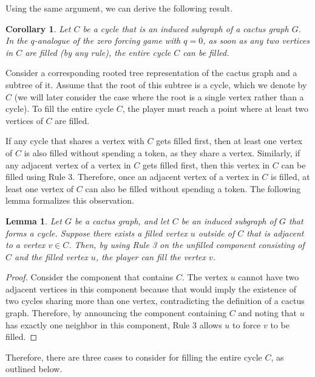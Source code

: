 \documentclass[11pt]{article}
\theoremstyle{plain}
\newtheorem{corollary}[theorem]{Corollary}
\newtheorem{lemma}[theorem]{Lemma}
\theoremstyle{definition}
\theoremstyle{remark}
\begin{document}
Using the same argument, we can derive the following result.

\begin{corollary}
   Let $C$ be a cycle that is an induced subgraph of a cactus graph $G$. In the $q$-analogue of the zero forcing game with $q = 0$, as soon as any two vertices in $C$ are filled (by any rule), the entire cycle $C$ can be filled.
\end{corollary}

Consider a corresponding rooted tree representation of the cactus graph and a subtree of it. Assume that the root of this subtree is a cycle, which we denote by $C$ (we will later consider the case where the root is a single vertex rather than a cycle). To fill the entire cycle $C$, the player must reach a point where at least two vertices of $C$ are filled. 

If any cycle that shares a vertex with $C$ gets filled first, then at least one vertex of $C$ is also filled without spending a token, as they share a vertex. Similarly, if any adjacent vertex of a vertex in $C$ gets filled first, then this vertex in $C$ can be filled using Rule 3. Therefore, once an adjacent vertex of a vertex in $C$ is filled, at least one vertex of $C$ can also be filled without spending a token. The following lemma formalizes this observation.

\begin{lemma}
    Let $G$ be a cactus graph, and let $C$ be an induced subgraph of $G$ that forms a cycle. Suppose there exists a filled vertex $u$ outside of $C$ that is adjacent to a vertex $v \in C$. Then, by using Rule 3 on the unfilled component consisting of $C$ and the filled vertex $u$, the player can fill the vertex $v$.
\end{lemma}

\begin{proof}
    Consider the component that contains $C$. The vertex $u$ cannot have two adjacent vertices in this component because that would imply the existence of two cycles sharing more than one vertex, contradicting the definition of a cactus graph. Therefore, by announcing the component containing $C$ and noting that $u$ has exactly one neighbor in this component, Rule 3 allows $u$ to force $v$ to be filled.
\end{proof}

Therefore, there are three cases to consider for filling the entire cycle $C$, as outlined below.
\end{document}
